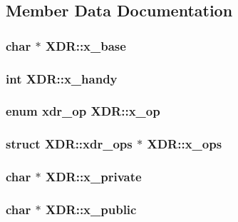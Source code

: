 \subsection{\-Member \-Data \-Documentation}
\hypertarget{structXDR_a8a4670e3776f48cef9fad5f1db2990d4}{
\subsubsection[{x\-\_\-base}]{\setlength{\rightskip}{0pt plus 5cm}char $\ast$ {\bf \-X\-D\-R\-::x\-\_\-base}}}\label{structXDR_a8a4670e3776f48cef9fad5f1db2990d4}
\hypertarget{structXDR_a714d1886692afcceb5cb7917e4cb294d}{
\subsubsection[{x\-\_\-handy}]{\setlength{\rightskip}{0pt plus 5cm}int {\bf \-X\-D\-R\-::x\-\_\-handy}}}\label{structXDR_a714d1886692afcceb5cb7917e4cb294d}
\hypertarget{structXDR_ac51509abcf1204ea1ef2d7631cec3294}{
\subsubsection[{x\-\_\-op}]{\setlength{\rightskip}{0pt plus 5cm}enum {\bf xdr\-\_\-op} {\bf \-X\-D\-R\-::x\-\_\-op}}}\label{structXDR_ac51509abcf1204ea1ef2d7631cec3294}
\hypertarget{structXDR_a1db48a837f054018101e935193a37795}{
\subsubsection[{x\-\_\-ops}]{\setlength{\rightskip}{0pt plus 5cm}struct {\bf \-X\-D\-R\-::xdr\-\_\-ops} $\ast$ {\bf \-X\-D\-R\-::x\-\_\-ops}}}\label{structXDR_a1db48a837f054018101e935193a37795}
\hypertarget{structXDR_ad1715f744bce85d10ea75812630d67ed}{
\subsubsection[{x\-\_\-private}]{\setlength{\rightskip}{0pt plus 5cm}char $\ast$ {\bf \-X\-D\-R\-::x\-\_\-private}}}\label{structXDR_ad1715f744bce85d10ea75812630d67ed}
\hypertarget{structXDR_ae6273a214187a6ac600619e3f7cb169b}{
\subsubsection[{x\-\_\-public}]{\setlength{\rightskip}{0pt plus 5cm}char $\ast$ {\bf \-X\-D\-R\-::x\-\_\-public}}}\label{structXDR_ae6273a214187a6ac600619e3f7cb169b}


